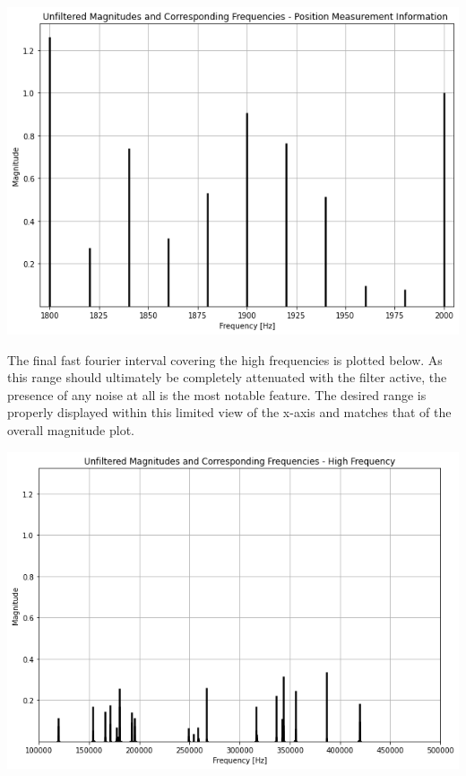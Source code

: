 \documentclass[12pt]{report}
\begin{document}
\begin{center}
	\includegraphics[scale = 0.5]{Lab 12 - Plots/Unfiltered FFT3.png}\\[1.0 cm]
\end{center}

The final fast fourier interval covering the high frequencies is plotted below. As this range should ultimately be completely attenuated with the filter active, the presence of any noise at all is the most notable feature. The desired range is properly displayed within this limited view of the x-axis and matches that of the overall magnitude plot. \\

\begin{center}
	\includegraphics[scale = 0.5]{Lab 12 - Plots/Unfiltered FFT4.png}\\[1.0 cm]
\end{center}
\end{document}
